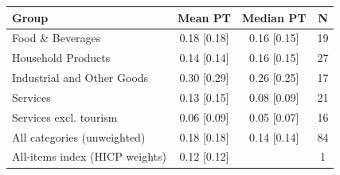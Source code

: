 \begin{tabular}{lccc}
\toprule
Group & Mean PT & Median PT & N \\
\midrule
Food \& Beverages & 0.18 [0.18] & 0.16 [0.15] & 19 \\
Household Products & 0.14 [0.14] & 0.16 [0.15] & 27 \\
Industrial and Other Goods & 0.30 [0.29] & 0.26 [0.25] & 17 \\
Services & 0.13 [0.15] & 0.08 [0.09] & 21 \\
Services excl. tourism & 0.06 [0.09] & 0.05 [0.07] & 16 \\
All categories (unweighted) & 0.18 [0.18] & 0.14 [0.14] & 84 \\
All-items index (HICP weights) & 0.12 [0.12] &  & 1 \\
\bottomrule
\end{tabular}
